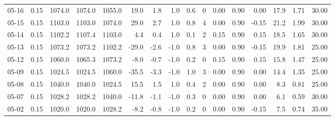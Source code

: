 \begin{threeparttable}
{\begin{tabular}{lrrrrrrrrrrrrrrr}
  05-16 &     0.15 & 1074.0 & 1074.0 & 1055.0 &       19.0 &            1.8 &                      1.0 &                 0.6 &              0 &       0.00 &      0.90 &           0.00 &             17.9 &            1.71 &                  30.00 \\
  05-15 &     0.15 & 1103.0 & 1103.0 & 1074.0 &       29.0 &            2.7 &                      1.0 &                 0.8 &              4 &       0.00 &      0.90 &          -0.15 &             21.2 &            1.99 &                  30.00 \\
  05-14 &     0.15 & 1102.2 & 1107.4 & 1103.0 &        4.4 &            0.4 &                      1.0 &                 0.1 &              2 &       0.15 &      0.90 &           0.15 &             18.5 &            1.65 &                  30.00 \\
  05-13 &     0.15 & 1073.2 & 1073.2 & 1102.2 &      -29.0 &           -2.6 &                     -1.0 &                 0.8 &              3 &       0.00 &      0.90 &          -0.15 &             19.9 &            1.81 &                  25.00 \\
  05-12 &     0.15 & 1060.0 & 1065.3 & 1073.2 &       -8.0 &           -0.7 &                     -1.0 &                 0.2 &              0 &       0.15 &      0.90 &           0.15 &             15.8 &            1.47 &                  25.00 \\
  05-09 &     0.15 & 1024.5 & 1024.5 & 1060.0 &      -35.5 &           -3.3 &                     -1.0 &                 1.0 &              3 &       0.00 &      0.90 &           0.00 &             14.4 &            1.35 &                  25.00 \\
  05-08 &     0.15 & 1040.0 & 1040.0 & 1024.5 &       15.5 &            1.5 &                      1.0 &                 0.4 &              2 &       0.00 &      0.90 &           0.00 &              8.3 &            0.81 &                  25.00 \\
  05-07 &     0.15 & 1028.2 & 1028.2 & 1040.0 &      -11.8 &           -1.1 &                     -1.0 &                 0.3 &              0 &       0.00 &      0.90 &           0.00 &              6.1 &            0.59 &                  30.00 \\
  05-02 &     0.15 & 1020.0 & 1020.0 & 1028.2 &       -8.2 &           -0.8 &                     -1.0 &                 0.2 &              0 &       0.00 &      0.90 &          -0.15 &              7.5 &            0.74 &                  35.00 \\

\end{tabular}}
\end{threeparttable}
